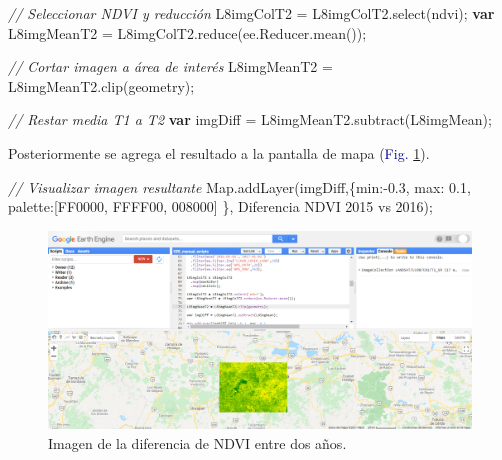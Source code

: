 \documentclass[
  12pt,
  letterpaper,
  twoside]{book}
\newenvironment{Shaded}{\begin{snugshade}}{\end{snugshade}}
\newcommand{\AttributeTok}[1]{\textcolor[rgb]{0.48,0.12,0.64}{#1}}
\newcommand{\BuiltInTok}[1]{#1}
\newcommand{\CommentTok}[1]{\textcolor[rgb]{0.24,0.58,0.00}{\textit{#1}}}
\newcommand{\DataTypeTok}[1]{\textcolor[rgb]{0.00,0.00,0.00}{#1}}
\newcommand{\FloatTok}[1]{\textcolor[rgb]{0.28,0.53,0.93}{#1}}
\newcommand{\FunctionTok}[1]{\textcolor[rgb]{0.48,0.12,0.64}{#1}}
\newcommand{\KeywordTok}[1]{\textcolor[rgb]{0.00,0.00,0.00}{\textbf{#1}}}
\newcommand{\NormalTok}[1]{#1}
\newcommand{\OperatorTok}[1]{\textcolor[rgb]{0.00,0.00,0.00}{#1}}
\newcommand{\StringTok}[1]{\textcolor[rgb]{0.87,0.29,0.22}{#1}}
\begin{document}
\begin{Shaded}
\begin{Highlighting}[]
\CommentTok{// Seleccionar NDVI y reducción}
\NormalTok{L8imgColT2 }\OperatorTok{=}\NormalTok{ L8imgColT2}\OperatorTok{.}\FunctionTok{select}\NormalTok{(}\StringTok{\textquotesingle{}ndvi\textquotesingle{}}\NormalTok{)}\OperatorTok{;}
\KeywordTok{var}\NormalTok{ L8imgMeanT2 }\OperatorTok{=}\NormalTok{ L8imgColT2}\OperatorTok{.}\FunctionTok{reduce}\NormalTok{(ee}\OperatorTok{.}\AttributeTok{Reducer}\OperatorTok{.}\FunctionTok{mean}\NormalTok{())}\OperatorTok{;}

\CommentTok{// Cortar imagen a área de interés}
\NormalTok{L8imgMeanT2 }\OperatorTok{=}\NormalTok{ L8imgMeanT2}\OperatorTok{.}\FunctionTok{clip}\NormalTok{(geometry)}\OperatorTok{;}

\CommentTok{// Restar media T1 a T2}
\KeywordTok{var}\NormalTok{ imgDiff }\OperatorTok{=}\NormalTok{ L8imgMeanT2}\OperatorTok{.}\FunctionTok{subtract}\NormalTok{(L8imgMean)}\OperatorTok{;}  
\end{Highlighting}
\end{Shaded}

Posteriormente se agrega el resultado a la pantalla de mapa (\textcolor{darkblue}{Fig.} \ref{fig:f1023}).

\begin{Shaded}
\begin{Highlighting}[]
\CommentTok{// Visualizar imagen resultante}
\BuiltInTok{Map}\OperatorTok{.}\FunctionTok{addLayer}\NormalTok{(imgDiff}\OperatorTok{,}\NormalTok{\{}\DataTypeTok{min}\OperatorTok{:{-}}\FloatTok{0.3}\OperatorTok{,} \DataTypeTok{max}\OperatorTok{:} \FloatTok{0.1}\OperatorTok{,} 
  \DataTypeTok{palette}\OperatorTok{:}\NormalTok{[}\StringTok{\textquotesingle{}FF0000\textquotesingle{}}\OperatorTok{,} \StringTok{\textquotesingle{}FFFF00\textquotesingle{}}\OperatorTok{,} \StringTok{\textquotesingle{}008000\textquotesingle{}}\NormalTok{] \}}\OperatorTok{,} 
  \StringTok{\textquotesingle{}Diferencia NDVI 2015 vs 2016\textquotesingle{}}\NormalTok{)}\OperatorTok{;}
\end{Highlighting}
\end{Shaded}

\begin{figure}[H]

{\centering \includegraphics[width=0.95\linewidth]{Img/imDifNDVI} 

}

\caption{Imagen de la diferencia de NDVI entre dos años.}\label{fig:f1023}
\end{figure}
\end{document}
